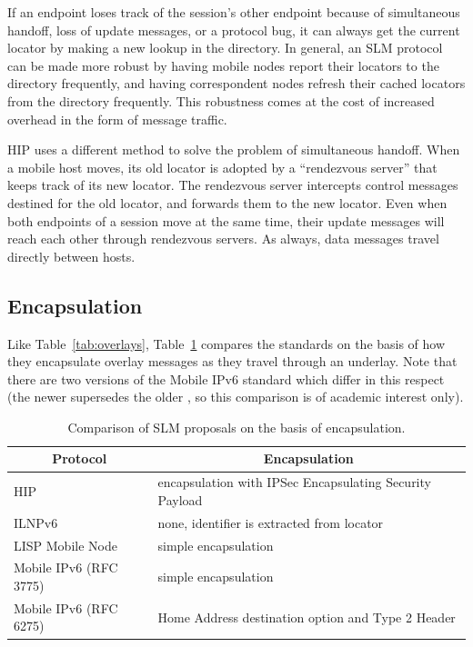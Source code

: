 If an endpoint loses track of the session's other endpoint because
of simultaneous handoff, loss of update messages, or a protocol bug,
it can always get the current locator by making a new lookup
in the directory.
In general, an SLM protocol can be made more robust by having mobile
nodes report their locators to the directory frequently,
and having correspondent nodes refresh their cached locators
from the directory frequently.
This robustness comes at the cost of increased overhead in the
form of message traffic.

HIP uses a different method to solve the problem of simultaneous handoff.
When a mobile host moves, its old locator is adopted by a
``rendezvous server'' that keeps track of its new locator.
The rendezvous server intercepts control messages destined for the
old locator, and forwards them to the new locator.
Even when both endpoints of a session move at the same time,
their update messages will reach each other through rendezvous servers.
As always, data messages travel directly between hosts.

\subsection{Encapsulation}

Like Table~\ref{tab:overlays},
Table~\ref{tab:slm3} compares the standards on the basis of
how they encapsulate overlay messages as they travel through an
underlay.
Note that there are two versions of the Mobile IPv6 standard which
differ in this respect (the newer \cite{mipv6new} supersedes the 
older \cite{mipv6old}, so this
comparison is of academic interest only).

\begin{table}
\begin{center}
\footnotesize
\begin{tabular}{|l|l|} \hline
\multicolumn{1}{|c|}{\bf Protocol} & 
  \multicolumn{1}{c|}{\bf Encapsulation} \\ \hline 
HIP & encapsulation with IPSec Encapsulating Security Payload \\ \hline
ILNPv6 & none, identifier is extracted from locator \\ \hline
LISP Mobile Node & simple encapsulation \\ \hline
Mobile IPv6 (RFC 3775) & simple encapsulation  \\ \hline
Mobile IPv6 (RFC 6275) & Home Address destination option and Type 2 Header  \\ \hline
\end{tabular}
\end{center}
\caption{Comparison of SLM proposals on the basis of encapsulation.}
\label{tab:slm3}
\end{table}

